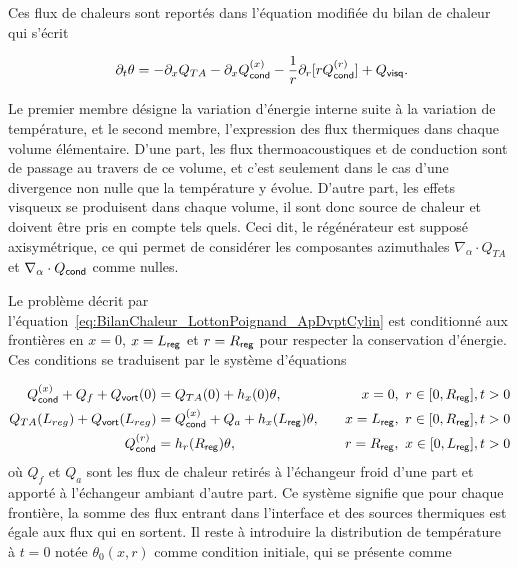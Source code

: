 \begin{enumerate}[label=\textbf{(\roman*)}]
\end{enumerate} 

Ces flux de chaleurs sont reportés dans l'équation modifiée du bilan de chaleur qui s'écrit


\begin{equation}
[\Phi\rho_0 C_p + (1-\Phi)\rho_s C_s]\ \partial_t \theta = - \partial_x Q_{TA} - \partial_x Q_{\sf cond}^{(x)} - \frac{1}{r}\partial_r[r Q_{\sf cond}^{(r)}] + Q_{\sf visq}.
\label{eq:BilanChaleur_LottonPoignand_ApDvptCylin}
\end{equation}

Le premier membre désigne la variation d'énergie interne suite à la variation de température, et le second membre, l'expression des flux thermiques dans chaque volume élémentaire. D'une part, les flux thermoacoustiques et de conduction sont \og de passage \fg{} au travers de ce volume, et c'est seulement dans le cas d'une divergence non nulle que la température y évolue. D'autre part, les effets visqueux se produisent dans chaque volume, il sont donc source de chaleur et doivent être pris en compte tels quels. Ceci dit, le régénérateur est supposé axisymétrique, ce qui permet de considérer les composantes azimuthales $\nabla_\alpha \cdot Q_{TA}$ et $\nabla_\alpha \cdot Q_{\sf cond}$ comme nulles.

Le problème décrit par l'équation~\ref{eq:BilanChaleur_LottonPoignand_ApDvptCylin} est conditionné aux frontières en $x=0$, $x=L_{\sf reg}$ et $r=R_{\sf reg}$ pour respecter la conservation d'énergie. Ces conditions se traduisent par le système d'équations

\begin{subequations}
	\begin{align}
		Q_{\sf cond}^{(x)} + Q_f + Q_{\sf vort}(0) &= Q_{TA}(0) + h_x(0)\theta,\quad &x=0,\ r \in [0,R_{\sf reg}], t>0 \label{eq:CondFront_x_0Froid}\\%
		Q_{TA}(L_{reg}) + Q_{\sf vort}(L_{reg})  &= Q_{\sf cond}^{(x)} + Q_a + h_x(L_{\sf reg})\theta, \quad &x=L_{\sf reg},\ r \in [0,R_{\sf reg}], t>0 \label{eq:CondFront_x_LregAmb}\\%
		Q_{\sf cond}^{(r)} &= h_r(R_{\sf reg})\theta, \quad &r=R_{\sf reg},\ x \in [0,L_{\sf reg}], t>0 \label{eq:CondFront_r_ra}
	\end{align}%
	\label{eq:CondFront}%
\end{subequations}
où $Q_f$ et $Q_a$ sont les flux de chaleur retirés à l'échangeur froid d'une part et apporté à l'échangeur ambiant d'autre part. Ce système signifie que pour chaque frontière, la somme des flux entrant dans l'interface et des sources thermiques est égale aux flux qui en sortent. Il reste à introduire la distribution de température à $t=0$ notée $\theta_0(x,r)$ comme condition initiale, qui se présente comme

